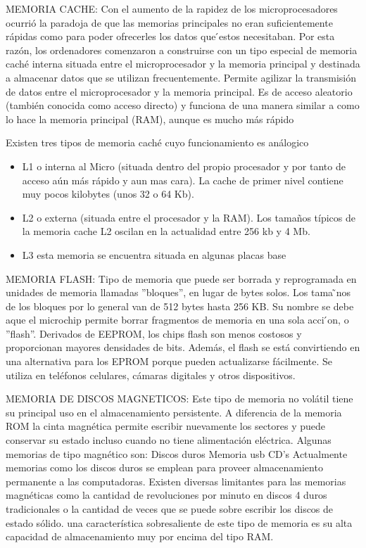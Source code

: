 \documentclass{article}
\begin{document}
MEMORIA CACHE: Con el aumento de la rapidez de los microprocesadores ocurrió la paradoja de que las memorias principales no eran suficientemente rápidas como para poder ofrecerles los datos que  ́estos necesitaban. Por esta razón, los ordenadores comenzaron a construirse con un tipo especial de memoria caché interna situada entre el microprocesador y la memoria principal y destinada a almacenar datos que se utilizan frecuentemente. Permite agilizar la transmisión de datos entre el microprocesador y la memoria principal. Es de acceso aleatorio (también conocida como acceso directo) y funciona de una manera similar a como lo hace la memoria principal (RAM), aunque es mucho más rápido

Existen tres tipos de memoria caché cuyo funcionamiento es análogico

\begin{itemize}
\item{L1 o interna al Micro (situada dentro del propio procesador y por tanto de acceso aún más rápido y aun mas
cara). La cache de primer nivel contiene muy pocos kilobytes (unos 32 o 64 Kb).}
\end{itemize}

\begin{itemize}
\item{L2 o externa (situada entre el procesador y la RAM). Los tamaños típicos de la memoria cache L2 oscilan en
la actualidad entre 256 kb y 4 Mb.}
\end{itemize}

\begin{itemize}
\item{L3 esta memoria se encuentra situada en algunas placas base}
\end{itemize}

MEMORIA FLASH: Tipo de memoria que puede ser borrada y reprogramada en unidades de memoria llamadas ”bloques”, en lugar de bytes solos. Los tama ̃nos de los bloques por lo general van de 512 bytes hasta 256 KB. Su nombre se debe aque el microchip permite borrar fragmentos de memoria en una sola acci ́on, o ”flash”. Derivados de EEPROM, los  chips flash son menos costosos y proporcionan mayores densidades de bits. Además, el flash se está convirtiendo en una alternativa para los EPROM porque pueden actualizarse fácilmente. Se utiliza en teléfonos celulares, cámaras digitales y otros dispositivos.

MEMORIA DE DISCOS MAGNETICOS: Este tipo de memoria no volátil tiene su principal uso en el almacenamiento persistente. A diferencia de la memoria ROM la cinta magnética permite escribir nuevamente los sectores y puede conservar su estado incluso cuando no tiene alimentación eléctrica. Algunas memorias de tipo magnético son: Discos duros Memoria usb CD’s Actualmente memorias como los discos duros se emplean para proveer almacenamiento permanente a las computadoras. Existen diversas limitantes para las memorias magnéticas como la cantidad de revoluciones por minuto en discos 4 duros tradicionales o la cantidad de veces que se puede sobre escribir los discos de estado sólido. una característica sobresaliente de este tipo de memoria es su alta capacidad de almacenamiento muy por encima del tipo RAM.
\end{document}
